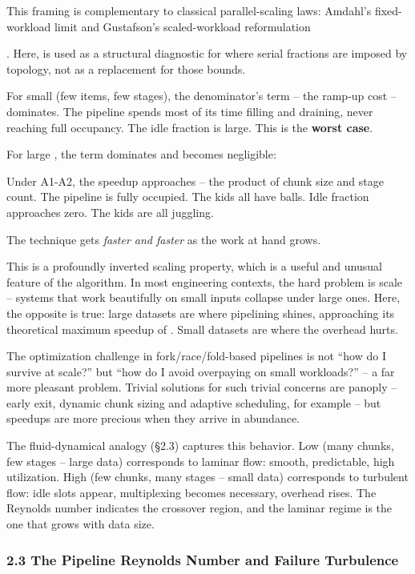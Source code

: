 \documentclass[
]{article}
\begin{document}
This framing is complementary to classical parallel-scaling laws:
Amdahl's fixed-workload limit and Gustafson's scaled-workload
reformulation

. Here, is used as a structural diagnostic for where serial fractions
are imposed by topology, not as a replacement for those bounds.

For small (few items, few stages), the denominator's term -- the ramp-up
cost -- dominates. The pipeline spends most of its time filling and
draining, never reaching full occupancy. The idle fraction is large.
This is the \textbf{worst case}.

For large , the term dominates and becomes negligible:

Under A1-A2, the speedup approaches -- the product of chunk size and
stage count. The pipeline is fully occupied. The kids all have balls.
Idle fraction approaches zero. The kids are all juggling.

The technique gets \emph{faster and faster} as the work at hand grows.

This is a profoundly inverted scaling property, which is a useful and
unusual feature of the algorithm. In most engineering contexts, the hard
problem is scale -- systems that work beautifully on small inputs
collapse under large ones. Here, the opposite is true: large datasets
are where pipelining shines, approaching its theoretical maximum speedup
of . Small datasets are where the overhead hurts.

The optimization challenge in fork/race/fold-based pipelines is not
``how do I survive at scale?'' but ``how do I avoid overpaying on small
workloads?'' -- a far more pleasant problem. Trivial solutions for such
trivial concerns are panoply -- early exit, dynamic chunk sizing and
adaptive scheduling, for example -- but speedups are more precious when
they arrive in abundance.

The fluid-dynamical analogy (§2.3) captures this behavior. Low (many
chunks, few stages -- large data) corresponds to laminar flow: smooth,
predictable, high utilization. High (few chunks, many stages -- small
data) corresponds to turbulent flow: idle slots appear, multiplexing
becomes necessary, overhead rises. The Reynolds number indicates the
crossover region, and the laminar regime is the one that grows with data
size.

\subsubsection{\texorpdfstring{\textbf{2.3 The Pipeline Reynolds Number
and Failure
Turbulence}}{2.3 The Pipeline Reynolds Number and Failure Turbulence}}\label{the-pipeline-reynolds-number-and-failure-turbulence}
\end{document}
